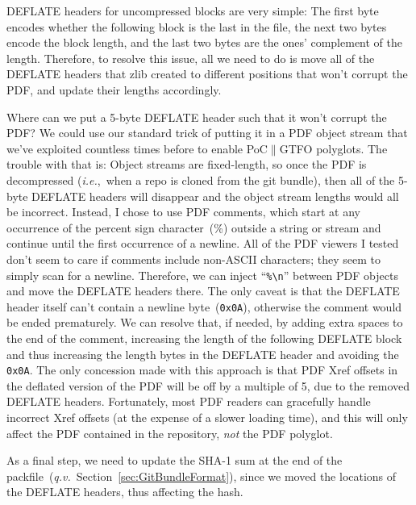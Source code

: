 \documentclass{article}
\begin{document}
DEFLATE headers for uncompressed blocks are very simple: The first
byte encodes whether the following block is the last in the file, the
next two bytes encode the block length, and the last two bytes are the
ones' complement of the length.  Therefore, to resolve this issue, all
we need to do is move all of the DEFLATE headers that zlib created to
different positions that won't corrupt the PDF, and update their
lengths accordingly.

Where can we put a 5-byte DEFLATE header such that it won't corrupt
the PDF? We could use our standard trick of putting it in a PDF object
stream that we've exploited countless times before to enable
PoC$\|$GTFO polyglots. The trouble with that is: Object streams are
fixed-length, so once the PDF is decompressed (\textit{i.e.},~when a
repo is cloned from the git bundle), then all of the 5-byte DEFLATE
headers will disappear and the object stream lengths would all be
incorrect. Instead, I chose to use PDF comments, which start at any
occurrence of the percent sign character~(\%) outside a string or
stream and continue until the first occurrence of a newline.  All of
the PDF viewers I tested don't seem to care if comments include
non-ASCII characters; they seem to simply scan for a
newline. Therefore, we can inject ``\texttt{\%\textbackslash n}''
between PDF objects and move the DEFLATE headers there. The only
caveat is that the DEFLATE header itself can't contain a newline
byte~(\texttt{0x0A}), otherwise the comment would be ended
prematurely.  We can resolve that, if needed, by adding extra spaces
to the end of the comment, increasing the length of the following
DEFLATE block and thus increasing the length bytes in the DEFLATE
header and avoiding the \texttt{0x0A}. The only concession made with
this approach is that PDF Xref offsets in the deflated version of the
PDF will be off by a multiple of 5, due to the removed DEFLATE
headers. Fortunately, most PDF readers can gracefully handle incorrect
Xref offsets (at the expense of a slower loading time), and this will
only affect the PDF contained in the repository, \emph{not} the PDF
polyglot.

As a final step, we need to update the SHA-1 sum at the end of the
packfile~(\textit{q.v.}~Section~\ref{sec:GitBundleFormat}), since we
moved the locations of the DEFLATE headers, thus affecting the hash.
\end{document}

